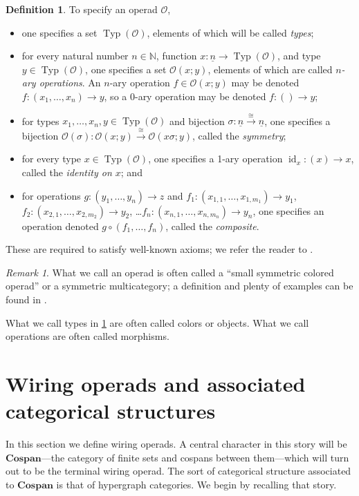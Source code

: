 \documentclass[11pt, article, oneside]{memoir}
\theoremstyle{plain}
\theoremstyle{definition}
\newtheorem{definition}[theorem]{Definition}
\theoremstyle{remark}
\newtheorem{remark}[theorem]{Remark}
\newcommand{\cat}[1]{\mathcal{#1}}
\newcommand{\Cat}[1]{\mathbf{#1}}
\DeclareMathOperator{\id}{id}
\DeclareMathOperator{\Typ}{Typ}
\newcommand{\NN}{\mathbb{N}}
\newcommand{\To}[1]{\xrightarrow{#1}}
\newcommand{\ul}[1]{\underline{#1}}
\newcommand{\Cospan}{\Cat{Cospan}}
\newcommand{\OO}{\cat{O}}
\begin{document}
\begin{definition}\label{def.operad}
To specify an operad $\OO$,
\begin{itemize}
	\item one specifies a set $\Typ(\OO)$, elements of which will be called \emph{types};
	\item for every natural number $n\in\NN$, function $x\colon\ul{n}\to\Typ(\OO)$, and type $y\in\Typ(\OO)$, one specifies a set $\OO(x;y)$, elements of which are called \emph{$n$-ary operations}. An $n$-ary operation $f\in\OO(x;y)$ may be denoted $f\colon(x_1,\ldots,x_n)\to y$, so a $0$-ary operation may be denoted $f\colon()\to y$;
	\item for types $x_1,\ldots,x_n,y\in\Typ(\OO)$ and bijection $\sigma\colon\ul{n}\To{\cong}\ul{n}$, one specifies a bijection $\OO(\sigma)\colon\OO(x;y)\To\cong\OO(x\sigma;y)$, called the \emph{symmetry};
	\item for every type $x\in\Typ(\OO)$, one specifies a 1-ary operation $\id_x\colon(x)\to x$, called the \emph{identity on $x$}; and
	\item for operations $g\colon(y_1,\ldots,y_n)\to z$ and $f_1\colon(x_{1,1},\ldots,x_{1,m_1})\to y_1$, $f_2\colon(x_{2,1},\ldots,x_{2,m_2})\to y_2$, \ldots $f_n\colon(x_{n,1},\ldots,x_{n,m_n})\to y_n$, one specifies an operation denoted $g\circ(f_1,\ldots,f_n)$, called the \emph{composite}.
\end{itemize}
These are required to satisfy well-known axioms; we refer the reader to \cite[Definition 2.2.21(?)]{Leinster:2004a}.
\end{definition}

\begin{remark}
What we call an operad is often called a ``small symmetric colored operad'' or a symmetric multicategory; a definition and plenty of examples can be found in \cite{Leinster:2004a}.

What we call types in \cref{def.operad} are often called colors or objects. What we call operations are often called morphisms.
\end{remark}

\chapter{Wiring operads and associated categorical structures}

In this section we define wiring operads. A central character in this story will be $\Cospan$---the category of finite sets and cospans between them---which will turn out to be the terminal wiring operad. The sort of categorical structure associated to $\Cospan$ is that of hypergraph categories. We begin by recalling that story.
\end{document}
